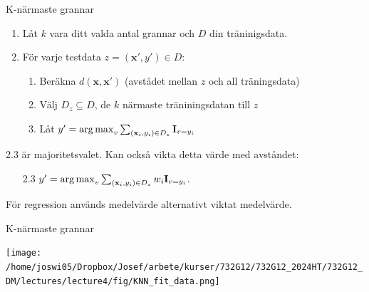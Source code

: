 \documentclass[10pt,english]{beamer}
\begin{document}
\begin{frame}{K-närmaste grannar}
    \begin{enumerate}
        \item Låt $k$ vara ditt valda antal grannar och $D$ din träninigsdata.
        \item För varje testdata $z = (\mathbf{x}', y') \in D$:
        \begin{enumerate}
            \item Beräkna $d(\mathbf{x},\mathbf{x}')$ (avstådet mellan $z$ och all träningsdata)
            \item Välj $D_z \subseteq D$, de $k$ närmaste träniningsdatan till $z$
            \item Låt $y' = \operatorname*{arg\,max}_v \sum_{(\mathbf{x}_i, y_i) \in D_z} \mathbf{I}_{v = y_i}$
        \end{enumerate}
    \end{enumerate}
    2.3 är majoritetsvalet. Kan också vikta detta värde med avståndet:
    \begin{itemize}
        \item[2.3] $y' = \operatorname*{arg\,max}_{v} \sum_{(\mathbf{x}_i, y_i) \in D_z} w_i \mathbf{I}_{v = y_i}$. 
    \end{itemize}

    För regression används medelvärde alternativt viktat medelvärde.
\end{frame}

\begin{frame}{K-närmaste grannar}

    \texttt{[image: /home/joswi05/Dropbox/Josef/arbete/kurser/732G12/732G12\_2024HT/732G12\_DM/lectures/lecture4/fig/KNN\_fit\_data.png]}
    
\end{frame}
\end{document}
